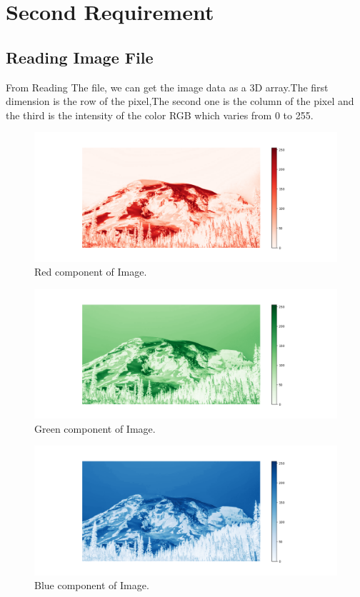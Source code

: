 \chapter{Second Requirement}
\section{Reading Image File}
From Reading The file, we can get the image data as a 3D array.The first dimension is the row of the pixel,The second one is the column of the pixel and the third is the intensity of the color RGB which varies from 0 to 255.
\vspace{20pt}

\begin{figure}[h]
    \centering
    \includegraphics[width=1\textwidth]{"../Image Components/a_red.png"}
    \caption{Red component of Image.}
    \label{fig:red_component_plot}
\end{figure}
\begin{figure}[h]
    \centering
    \includegraphics[width=1\textwidth]{"../Image Components/a_green.png"}
    \caption{Green component of Image.}
    \label{fig:green_component_plot}
\end{figure}
\begin{figure}[h]
    \centering
    \includegraphics[width=1\textwidth]{"../Image Components/a_blue.png"}
    \caption{Blue component of Image.}
    \label{fig:blue_component_plot}
\end{figure}